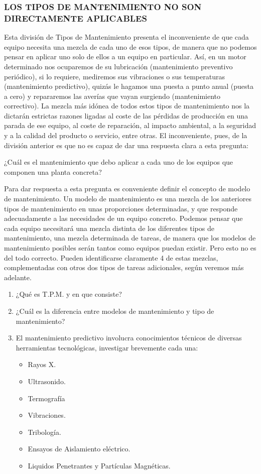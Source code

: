\documentclass[../main]{subfiles}
\begin{document}
\subsubsection*{LOS TIPOS DE MANTENIMIENTO NO SON
DIRECTAMENTE APLICABLES}
Esta división de Tipos de Mantenimiento presenta el inconveniente de que
cada equipo necesita una mezcla de cada uno de esos tipos, de manera que no
podemos pensar en aplicar uno solo de ellos a un equipo en particular.
Así, en un motor determinado nos ocuparemos de su lubricación (mantenimiento preventivo periódico), si lo requiere, mediremos sus vibraciones o
sus temperaturas (mantenimiento predictivo), quizás le hagamos una puesta a
punto anual (puesta a cero) y repararemos las averías que vayan surgiendo
(mantenimiento correctivo). La mezcla más idónea de todos estos tipos de
mantenimiento nos la dictarán estrictas razones ligadas al coste de las pérdidas de producción en una parada de ese equipo, al coste de reparación, al impacto ambiental, a la seguridad y a la calidad del producto o servicio, entre
otras.
El inconveniente, pues, de la división anterior es que no es capaz de dar
una respuesta clara a esta pregunta:

¿Cuál es el mantenimiento que debo aplicar a cada uno de los equipos que componen una planta concreta?

Para dar respuesta a esta pregunta es conveniente definir el concepto de modelo de mantenimiento. Un modelo de mantenimiento es una mezcla de los anteriores tipos de mantenimiento en unas proporciones determinadas, y que
responde adecuadamente a las necesidades de un equipo concreto. Podemos
pensar que cada equipo necesitará una mezcla distinta de los diferentes tipos
de mantenimiento, una mezcla determinada de tareas, de manera que los
modelos de mantenimiento posibles serán tantos como equipos puedan existir. Pero esto no es del todo correcto. Pueden identificarse claramente 4 de estas mezclas, complementadas con otros dos tipos de tareas adicionales, según
veremos más adelante.

\begin{enumerate}
    \item ¿Qué es T.P.M. y en que consiste?
    \item ¿Cuál es la diferencia entre modelos de mantenimiento y tipo de mantenimiento?
    \item El mantenimiento predictivo involucra conocimientos técnicos de diversas herramientas tecnológicas, investigar brevemente cada una:
    \begin{itemize}
        \item Rayos X.
        \item Ultrasonido.
        \item Termografía
        \item Vibraciones.
        \item Tribología.
        \item Ensayos de Aislamiento eléctrico.
        \item Liquidos Penetrantes y Partículas Magnéticas.
    \end{itemize}
\end{enumerate}
\end{document}
